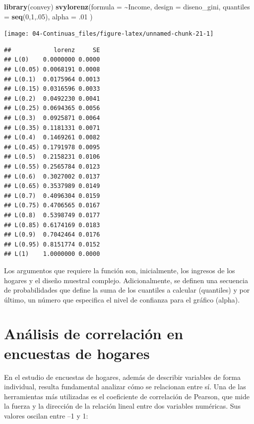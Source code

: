 \documentclass[
  spanish,
  12pt,
]{book}
\newenvironment{Shaded}{\begin{snugshade}}{\end{snugshade}}
\newcommand{\AttributeTok}[1]{\textcolor[rgb]{0.13,0.29,0.53}{#1}}
\newcommand{\DecValTok}[1]{\textcolor[rgb]{0.00,0.00,0.81}{#1}}
\newcommand{\FunctionTok}[1]{\textcolor[rgb]{0.13,0.29,0.53}{\textbf{#1}}}
\newcommand{\NormalTok}[1]{#1}
\newcommand{\SpecialCharTok}[1]{\textcolor[rgb]{0.81,0.36,0.00}{\textbf{#1}}}
\begin{document}
\begin{Shaded}
\begin{Highlighting}[]
\FunctionTok{library}\NormalTok{(convey)}
\FunctionTok{svylorenz}\NormalTok{(}\AttributeTok{formula =} \SpecialCharTok{\textasciitilde{}}\NormalTok{Income,}
          \AttributeTok{design =}\NormalTok{ diseno\_gini,}
          \AttributeTok{quantiles =} \FunctionTok{seq}\NormalTok{(}\DecValTok{0}\NormalTok{,}\DecValTok{1}\NormalTok{,.}\DecValTok{05}\NormalTok{),}
          \AttributeTok{alpha =}\NormalTok{ .}\DecValTok{01}\NormalTok{ )}
\end{Highlighting}
\end{Shaded}

\begin{center}\texttt{[image: 04-Continuas\_files/figure-latex/unnamed-chunk-21-1]} \end{center}

\begin{verbatim}
##            lorenz     SE
## L(0)    0.0000000 0.0000
## L(0.05) 0.0068191 0.0008
## L(0.1)  0.0175964 0.0013
## L(0.15) 0.0316596 0.0033
## L(0.2)  0.0492230 0.0041
## L(0.25) 0.0694365 0.0056
## L(0.3)  0.0925871 0.0064
## L(0.35) 0.1181331 0.0071
## L(0.4)  0.1469261 0.0082
## L(0.45) 0.1791978 0.0095
## L(0.5)  0.2158231 0.0106
## L(0.55) 0.2565784 0.0123
## L(0.6)  0.3027002 0.0137
## L(0.65) 0.3537989 0.0149
## L(0.7)  0.4096304 0.0159
## L(0.75) 0.4706565 0.0167
## L(0.8)  0.5398749 0.0177
## L(0.85) 0.6174169 0.0183
## L(0.9)  0.7042464 0.0176
## L(0.95) 0.8151774 0.0152
## L(1)    1.0000000 0.0000
\end{verbatim}

Los argumentos que requiere la función son, inicialmente, los ingresos de los hogares y el diseño muestral complejo. Adicionalmente, se definen una secuencia de probabilidades que define la suma de los cuantiles a calcular (quantiles) y por último, un número que especifica el nivel de confianza para el gráfico (alpha).

\section{Análisis de correlación en encuestas de hogares}\label{anuxe1lisis-de-correlaciuxf3n-en-encuestas-de-hogares}

En el estudio de encuestas de hogares, además de describir variables de forma individual, resulta fundamental analizar cómo se relacionan entre sí. Una de las herramientas más utilizadas es el coeficiente de correlación de Pearson, que mide la fuerza y la dirección de la relación lineal entre dos variables numéricas. Sus valores oscilan entre --1 y 1:
\end{document}
